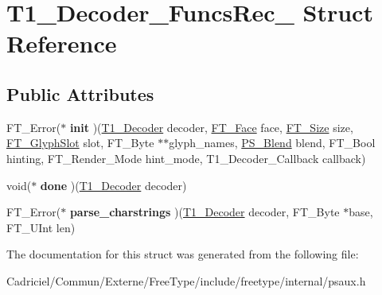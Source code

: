 \hypertarget{struct_t1___decoder___funcs_rec__}{\section{T1\-\_\-\-Decoder\-\_\-\-Funcs\-Rec\-\_\- Struct Reference}
\label{struct_t1___decoder___funcs_rec__}
}
\subsection*{Public Attributes}
\begin{DoxyCompactItemize}
\item 
\hypertarget{struct_t1___decoder___funcs_rec___a10baf5f433631fb6e73e639fca7e9478}{F\-T\-\_\-\-Error($\ast$ {\bfseries init} )(\hyperlink{struct_t1___decoder_rec__}{T1\-\_\-\-Decoder} decoder, \hyperlink{struct_f_t___face_rec__}{F\-T\-\_\-\-Face} face, \hyperlink{struct_f_t___size_rec__}{F\-T\-\_\-\-Size} size, \hyperlink{struct_f_t___glyph_slot_rec__}{F\-T\-\_\-\-Glyph\-Slot} slot, F\-T\-\_\-\-Byte $\ast$$\ast$glyph\-\_\-names, \hyperlink{struct_p_s___blend_rec__}{P\-S\-\_\-\-Blend} blend, F\-T\-\_\-\-Bool hinting, F\-T\-\_\-\-Render\-\_\-\-Mode hint\-\_\-mode, T1\-\_\-\-Decoder\-\_\-\-Callback callback)}\label{struct_t1___decoder___funcs_rec___a10baf5f433631fb6e73e639fca7e9478}

\item 
\hypertarget{struct_t1___decoder___funcs_rec___a2d76ed11eab173c09dc8f5cde75a64ee}{void($\ast$ {\bfseries done} )(\hyperlink{struct_t1___decoder_rec__}{T1\-\_\-\-Decoder} decoder)}\label{struct_t1___decoder___funcs_rec___a2d76ed11eab173c09dc8f5cde75a64ee}

\item 
\hypertarget{struct_t1___decoder___funcs_rec___a921b7ac2c00f97c425643c5a612b3c38}{F\-T\-\_\-\-Error($\ast$ {\bfseries parse\-\_\-charstrings} )(\hyperlink{struct_t1___decoder_rec__}{T1\-\_\-\-Decoder} decoder, F\-T\-\_\-\-Byte $\ast$base, F\-T\-\_\-\-U\-Int len)}\label{struct_t1___decoder___funcs_rec___a921b7ac2c00f97c425643c5a612b3c38}

\end{DoxyCompactItemize}


The documentation for this struct was generated from the following file\-:\begin{DoxyCompactItemize}
\item 
Cadriciel/\-Commun/\-Externe/\-Free\-Type/include/freetype/internal/psaux.\-h\end{DoxyCompactItemize}
